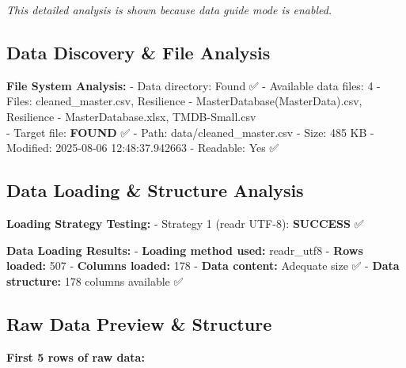 \documentclass[
  oneside,
  open=any,
  fontsize=11pt]{article}
\begin{document}
\emph{This detailed analysis is shown because data guide mode is
enabled.}

\subsection{Data Discovery \& File
Analysis}\label{data-discovery-file-analysis}

\textbf{File System Analysis:} - Data directory: Found ✅ - Available
data files: 4 - Files: cleaned\_master.csv, Resilience -
MasterDatabase(MasterData).csv, Resilience - MasterDatabase.xlsx,
TMDB-Small.csv\\
- Target file: \textbf{FOUND} ✅ - Path: data/cleaned\_master.csv -
Size: 485 KB - Modified: 2025-08-06 12:48:37.942663 - Readable: Yes ✅

\subsection{Data Loading \& Structure
Analysis}\label{data-loading-structure-analysis}

\textbf{Loading Strategy Testing:} - Strategy 1 (readr UTF-8):
\textbf{SUCCESS} ✅

\textbf{Data Loading Results:} - \textbf{Loading method used:}
readr\_utf8 - \textbf{Rows loaded:} 507 - \textbf{Columns loaded:} 178 -
\textbf{Data content:} Adequate size ✅ - \textbf{Data structure:} 178
columns available ✅

\subsection{Raw Data Preview \&
Structure}\label{raw-data-preview-structure}

\textbf{First 5 rows of raw data:}
\end{document}
